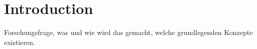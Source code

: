\chapter{Introduction}\label{Introduction}
Forschungsfrage, was und wie wird das gemacht, welche grundlegenden Konzepte existieren.
